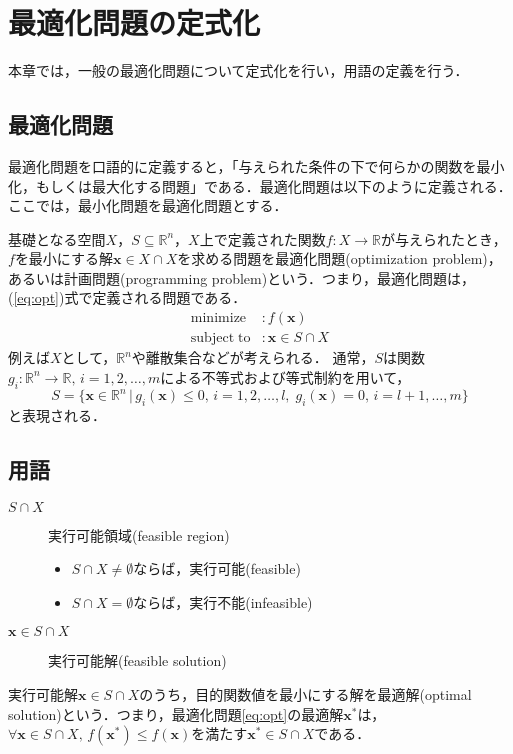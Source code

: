 \documentclass{jsreport}
\begin{document}
\chapter{最適化問題の定式化}
本章では，一般の最適化問題について定式化を行い，用語の定義を行う．
\section{最適化問題}
最適化問題を口語的に定義すると，「与えられた条件の下で何らかの関数を最小化，もしくは最大化する問題」である．最適化問題は以下のように定義される．ここでは，最小化問題を最適化問題とする．

基礎となる空間$X$，$S \subseteq \mathbb{R}^n$，$X$上で定義された関数$f: X \rightarrow \mathbb{R}$が与えられたとき，$f$を最小にする解$\bm{x} \in X \cap X$を求める問題を最適化問題(optimization problem)，あるいは計画問題(programming problem)という．つまり，最適化問題は，(\ref{eq:opt})式で定義される問題である．
\begin{align}\label{eq:opt}
  \mathrm{minimize} &: f(\bm{x}) \nonumber\\
  \mathrm{subject \; to} &: \bm{x} \in S \cap X
\end{align}
例えば$X$として，$\mathbb{R}^n$や離散集合などが考えられる．
通常，$S$は関数$g_i: \mathbb{R}^n \rightarrow \mathbb{R}, \, i = 1, 2, \ldots, m$による不等式および等式制約を用いて，
\begin{equation}\label{eq:const}
  S = \{\bm{x} \in \mathbb{R}^n \, | \, g_i(\bm{x}) \leq 0, \, i = 1, 2, \ldots, l, \; g_i(\bm{x}) = 0, \, i = l + 1, \ldots, m\}
\end{equation}
と表現される．

\section{用語}
\begin{description}
  \item[$S \cap X$] 実行可能領域(feasible region)
  \begin{itemize}
    \item $S \cap X \neq \emptyset$ならば，実行可能(feasible)
    \item $S \cap X = \emptyset$ならば，実行不能(infeasible)
  \end{itemize}
  \item[$\bm{x} \in S \cap X$] 実行可能解(feasible solution)
\end{description}

実行可能解$\bm{x} \in S \cap X$のうち，目的関数値を最小にする解を最適解(optimal solution)という．つまり，最適化問題\ref{eq:opt}の最適解$\bm{x}^*$は，$\forall \bm{x} \in S \cap X, \, f(\bm{x}^*) \leq f(\bm{x})$を満たす$\bm{x}^* \in S \cap X$である．
\end{document}
